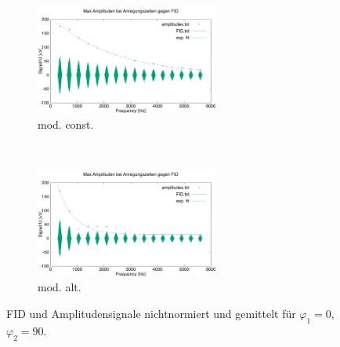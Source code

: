 \documentclass{article}
\begin{document}
        \begin{figure}[H]
            \centering
            \begin{subfigure}[b]{0.4\textwidth}
                \centering
                \includegraphics[width=6cm]{../Bilddateien/CPMG-0-90-constant-avg.png}
                \caption{mod. const.}
                \label{fig:CPMG-0-90-constant-avg}
            \end{subfigure}
            \
            \begin{subfigure}[b]{0.4\textwidth}
                \centering
                \includegraphics[width=6cm]{../Bilddateien/CPMG-0-90-alternating-avg.png}
                \caption{mod. alt.}
                \label{fig:CPMG-0-90-alternating-avg}
            \end{subfigure}
            \caption{FID und Amplitudensignale nichtnormiert und gemittelt für $\varphi_1 = 0$, $\varphi_2 = 90$.}
            \label{fig:CPMG-0-90-avg}
        \end{figure}
        
\end{document}
